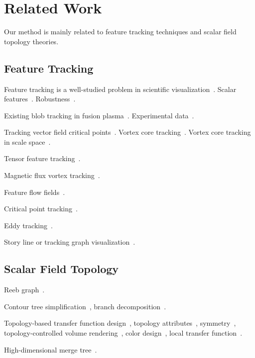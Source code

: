 \section{Related Work}

Our method is mainly related to feature tracking techniques and scalar field topology theories.  

\subsection{Feature Tracking}

Feature tracking is a well-studied problem in scientific visualization~\cite{PostVHLD2003}.  Scalar features~\cite{SilverW98}.  Robustness~\cite{SkrabaW14}.  

Existing blob tracking in fusion plasma~\cite{WuWSCCSCK16}.  Experimental data~\cite{DavisKMRSZ14}.  

Tracking vector field critical points~\cite{GarthTS04}.  Vortex core tracking~\cite{TheiselSWHS05}.  Vortex core tracking in scale space~\cite{BauerP02}.  

Tensor feature tracking~\cite{TricocheSH01, TricocheWSH02}.  

Magnetic flux vortex tracking~\cite{GuoPPKG16, GuoPG17, PhillipsGPKG16, PhillipsPKG15}.

Feature flow fields~\cite{TheiselS03, WeinkaufTGP11}. 

Critical point tracking~\cite{ReininghausKWH12}.

Eddy tracking~\cite{WoodringPSPAH16}.  

Story line or tracking graph visualization~\cite{TanahashiM12, GuoPPKG16}.  


\subsection{Scalar Field Topology}

Reeb graph~\cite{Reeb1946}.  

Contour tree simplification~\cite{CarrSP04, KreveldOBPS97}, branch decomposition~\cite{Pascucci2004}. 

Topology-based transfer function design~\cite{FujishiroAT99}, topology attributes~\cite{TakeshimaTFN04}, symmetry~\cite{ThomasN11}, topology-controlled volume rendering~\cite{WeberDCPH07}, color design~\cite{ZhouT09}, local transfer function~\cite{GuoY13}.  

High-dimensional merge tree~\cite{OesterlingHWMS17}. 
